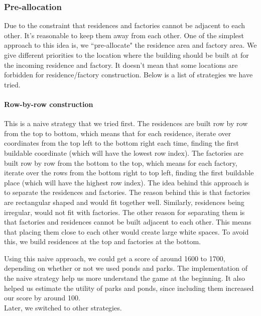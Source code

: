 \subsubsection{Pre-allocation}
Due to the constraint that residences and factories cannot be adjacent to each other. It's reasonable to keep them away from each other. One of the simplest approach to this idea is, we ``pre-allocate" the residence area and factory area. We give different priorities to the location where the building should be built at for the incoming residence and factory. It doesn't mean that some locations are forbidden for residence/factory construction. Below is a list of strategies we have tried.

\paragraph{Row-by-row construction}
This is a naive strategy that we tried first. The residences are built row by row from the top to bottom, which means that for each residence, iterate over coordinates from the top left to the bottom right each time, finding the first buildable coordinate (which will have the lowest row index). The factories are built row by row from the bottom to the top, which means for each factory, iterate over the rows from the bottom right to top left, finding the first buildable place (which will have the highest row index). The idea behind this approach is to separate the residences and factories. The reason behind this is that factories are rectangular shaped and would fit together well. Similarly, residences being irregular, would not fit with factories. The other reason for separating them is that factories and residences cannot be built adjacent to each other. This means that placing them close to each other would create large white spaces. To avoid this, we build residences at the top and factories at the bottom.

Using this naive approach, we could get a score of around 1600 to 1700, depending on whether or not we used ponds and parks. The implementation of the naive strategy help us more understand the game at the beginning. It also helped us estimate the utility of parks and ponds, since including them increased our score by around 100.\\
Later, we switched to other strategies.

